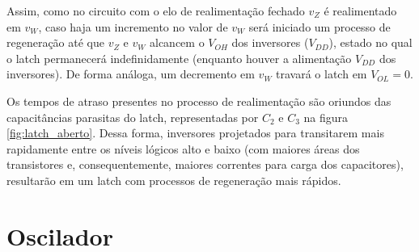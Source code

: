 \documentclass[11pt]{article}
\begin{document}
\begin{enumerate}[label=\alph*)]
Assim, como no circuito com o elo de realimentação fechado $v_Z$ é realimentado em $v_W$, caso haja um incremento no valor de $v_W$ será iniciado um processo de regeneração até que $v_Z$ e $v_W$ alcancem o $V_{OH}$ dos inversores ($V_{DD}$), estado no qual o latch permanecerá indefinidamente (enquanto houver a alimentação $V_{DD}$ dos inversores). De forma análoga, um decremento em $v_W$ travará o latch em $V_{OL} = 0$.

Os tempos de atraso presentes no processo de realimentação são oriundos das capacitâncias parasitas do latch, representadas por $C_2$ e $C_3$ na figura \ref{fig:latch_aberto}. Dessa forma, inversores projetados para transitarem mais rapidamente entre os níveis lógicos alto e baixo (com maiores áreas dos transistores e, consequentemente, maiores correntes para carga dos capacitores), resultarão em um latch com processos de regeneração mais rápidos.

\end{enumerate}

\section{Oscilador}
\end{document}
